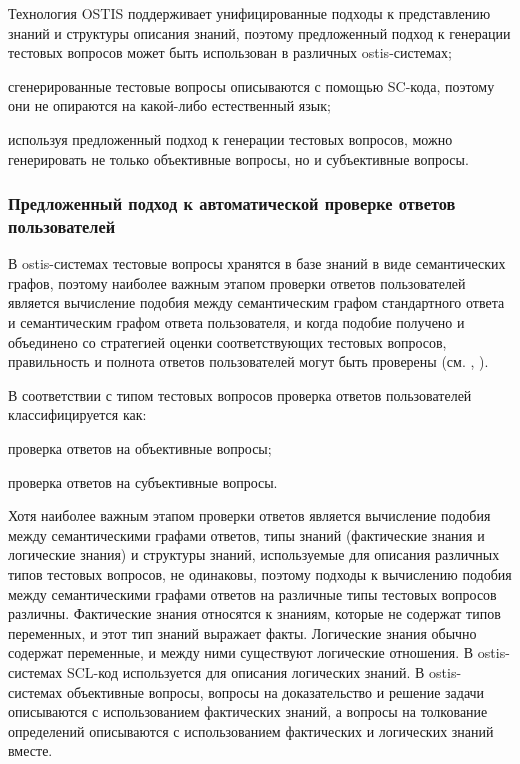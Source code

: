 \begin{textitemize}
	\item Технология OSTIS поддерживает унифицированные подходы к представлению знаний и структуры описания знаний, поэтому предложенный подход к генерации тестовых вопросов может быть использован в различных ostis-системах;
	\item сгенерированные тестовые вопросы описываются с помощью SC-кода, поэтому они не опираются на какой-либо естественный язык;
	\item используя предложенный подход к генерации тестовых вопросов, можно генерировать не только объективные вопросы, но и субъективные вопросы.
\end{textitemize}

\subsubsection{Предложенный подход к автоматической проверке ответов пользователей}

В ostis-системах тестовые вопросы хранятся в базе знаний в виде семантических графов, поэтому наиболее важным этапом проверки ответов пользователей является вычисление подобия между семантическим графом стандартного ответа и семантическим графом ответа пользователя, и когда подобие получено и объединено со стратегией оценки соответствующих тестовых вопросов, правильность и полнота ответов пользователей могут быть проверены (см. , ).

В соответствии с типом тестовых вопросов проверка ответов пользователей классифицируется как:

\begin{textitemize}
	\item проверка ответов на объективные вопросы;
	\item проверка ответов на субъективные вопросы.
\end{textitemize}

Хотя наиболее важным этапом проверки ответов является вычисление подобия между семантическими графами ответов, типы знаний (фактические знания и логические знания) и структуры знаний, используемые для описания различных типов тестовых вопросов, не одинаковы, поэтому подходы к вычислению подобия между семантическими графами ответов на различные типы тестовых вопросов различны. Фактические знания относятся к знаниям, которые не содержат типов переменных, и этот тип знаний выражает факты. Логические знания обычно содержат переменные, и между ними существуют логические отношения. В ostis-системах SCL-код используется для описания логических знаний. В ostis-системах объективные вопросы, вопросы на доказательство и решение задачи описываются с использованием фактических знаний, а вопросы на толкование определений описываются с использованием фактических и логических знаний вместе.

